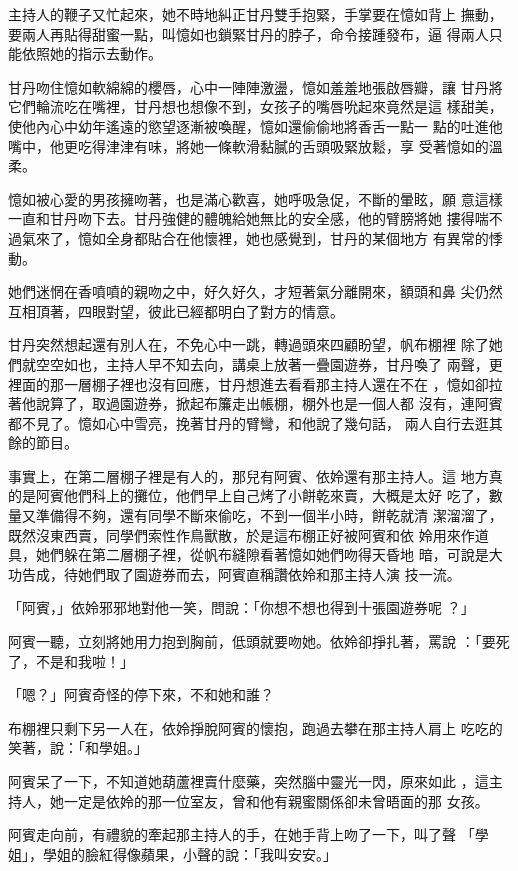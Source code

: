 主持人的鞭子又忙起來，她不時地糾正甘丹雙手抱緊，手掌要在憶如背上
撫動，要兩人再貼得甜蜜一點，叫憶如也鎖緊甘丹的脖子，命令接踵發布，逼
得兩人只能依照她的指示去動作。

甘丹吻住憶如軟綿綿的櫻唇，心中一陣陣激盪，憶如羞羞地張啟唇瓣，讓
甘丹將它們輪流吃在嘴裡，甘丹想也想像不到，女孩子的嘴唇吮起來竟然是這
樣甜美，使他內心中幼年遙遠的慾望逐漸被喚醒，憶如還偷偷地將香舌一點一
點的吐進他嘴中，他更吃得津津有味，將她一條軟滑黏膩的舌頭吸緊放鬆，享
受著憶如的溫柔。

憶如被心愛的男孩擁吻著，也是滿心歡喜，她呼吸急促，不斷的暈眩，願
意這樣一直和甘丹吻下去。甘丹強健的體魄給她無比的安全感，他的臂膀將她
摟得喘不過氣來了，憶如全身都貼合在他懷裡，她也感覺到，甘丹的某個地方
有異常的悸動。

她們迷惘在香噴噴的親吻之中，好久好久，才短著氣分離開來，額頭和鼻
尖仍然互相頂著，四眼對望，彼此已經都明白了對方的情意。

甘丹突然想起還有別人在，不免心中一跳，轉過頭來四顧盼望，帆布棚裡
除了她們就空空如也，主持人早不知去向，講桌上放著一疊園遊券，甘丹喚了
兩聲，更裡面的那一層棚子裡也沒有回應，甘丹想進去看看那主持人還在不在
，憶如卻拉著他說算了，取過園遊券，掀起布簾走出帳棚，棚外也是一個人都
沒有，連阿賓都不見了。憶如心中雪亮，挽著甘丹的臂彎，和他說了幾句話，
兩人自行去逛其餘的節目。

事實上，在第二層棚子裡是有人的，那兒有阿賓、依姈還有那主持人。這
地方真的是阿賓他們科上的攤位，他們早上自己烤了小餅乾來賣，大概是太好
吃了，數量又準備得不夠，還有同學不斷來偷吃，不到一個半小時，餅乾就清
潔溜溜了，既然沒東西賣，同學們索性作鳥獸散，於是這布棚正好被阿賓和依
姈用來作道具，她們躲在第二層棚子裡，從帆布縫隙看著憶如她們吻得天昏地
暗，可說是大功告成，待她們取了園遊券而去，阿賓直稱讚依姈和那主持人演
技一流。

「阿賓，」依姈邪邪地對他一笑，問說：「你想不想也得到十張園遊券呢
？」

阿賓一聽，立刻將她用力抱到胸前，低頭就要吻她。依姈卻掙扎著，罵說
：「要死了，不是和我啦！」

「嗯？」阿賓奇怪的停下來，不和她和誰？

布棚裡只剩下另一人在，依姈掙脫阿賓的懷抱，跑過去攀在那主持人肩上
吃吃的笑著，說：「和學姐。」

阿賓呆了一下，不知道她葫蘆裡賣什麼藥，突然腦中靈光一閃，原來如此
，這主持人，她一定是依姈的那一位室友，曾和他有親蜜關係卻未曾晤面的那
女孩。

阿賓走向前，有禮貌的牽起那主持人的手，在她手背上吻了一下，叫了聲
「學姐」，學姐的臉紅得像蘋果，小聲的說：「我叫安安。」

